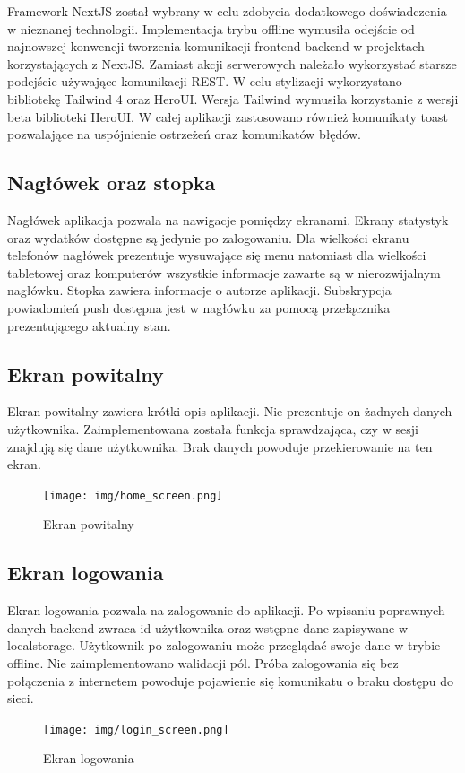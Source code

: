 \documentclass[11pt,titlepage]{article}
\begin{document}
Framework NextJS został wybrany w celu zdobycia dodatkowego doświadczenia w nieznanej technologii. Implementacja trybu offline wymusiła odejście od najnowszej konwencji tworzenia komunikacji frontend-backend w projektach korzystających z NextJS. Zamiast akcji serwerowych należało wykorzystać starsze podejście używające komunikacji REST.
W celu stylizacji wykorzystano bibliotekę Tailwind 4 oraz HeroUI. Wersja Tailwind wymusiła korzystanie z wersji beta biblioteki HeroUI.
W całej aplikacji zastosowano również komunikaty toast pozwalające na uspójnienie ostrzeżeń oraz komunikatów błędów.

\newpage

\subsection{Nagłówek oraz stopka}
Nagłówek aplikacja pozwala na nawigacje pomiędzy ekranami. Ekrany statystyk oraz wydatków dostępne są jedynie po zalogowaniu. Dla wielkości ekranu telefonów nagłówek prezentuje wysuwające się menu natomiast dla wielkości tabletowej oraz komputerów wszystkie informacje zawarte są w nierozwijalnym nagłówku. Stopka zawiera informacje o autorze aplikacji.
Subskrypcja powiadomień push dostępna jest w nagłówku za pomocą przełącznika prezentującego aktualny stan.

\subsection{Ekran powitalny}
Ekran powitalny zawiera krótki opis aplikacji. Nie prezentuje on żadnych danych użytkownika. Zaimplementowana została funkcja sprawdzająca, czy w sesji znajdują się dane użytkownika. Brak danych powoduje przekierowanie na ten ekran.
\begin{figure}[!h]
	\begin{center}
		\texttt{[image: img/home\_screen.png]}
	\end{center}
  \caption{Ekran powitalny}
\end{figure}

\newpage

\subsection{Ekran logowania}
Ekran logowania pozwala na zalogowanie do aplikacji. Po wpisaniu poprawnych danych backend zwraca id użytkownika oraz wstępne dane zapisywane w localstorage. Użytkownik po zalogowaniu może przeglądać swoje dane w trybie offline. Nie zaimplementowano walidacji pól. Próba zalogowania się bez połączenia z internetem powoduje pojawienie się komunikatu o braku dostępu do sieci.
\begin{figure}[!h]
	\begin{center}
		\texttt{[image: img/login\_screen.png]}
	\end{center}
  \caption{Ekran logowania}
\end{figure}
\end{document}
